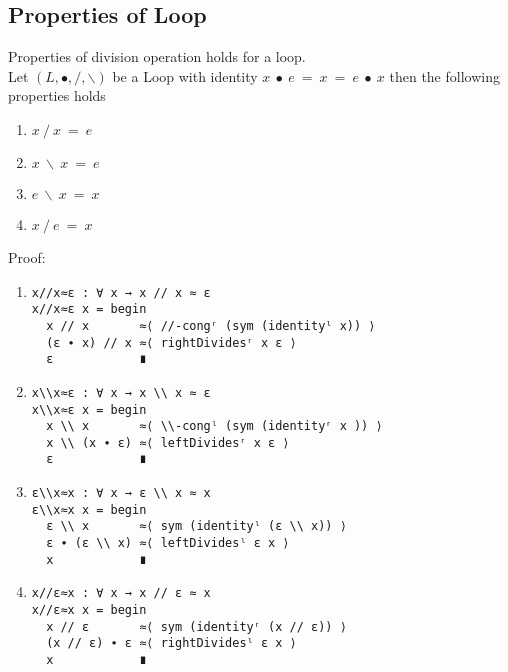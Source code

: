 \subsection{Properties of Loop}
Properties of division operation holds for a loop.\\
Let $(L, ∙, /, \backslash)$ be a Loop with identity $x\ ∙\ e\ =\ x\ =\ e\ ∙\ x$
then the following properties holds 
\begin{enumerate}
\item \(x \ /\  x\ =\ e\) 
\item \( x\ \backslash \ x\ =\ e\)
\item \(e\ \backslash \ x\ =\ x\) 
\item \(x\ /\ e\ =\ x\) 
\end{enumerate}
Proof:
\begin{enumerate}
\item 
\begin{verbatim}
x//x≈ε : ∀ x → x // x ≈ ε
x//x≈ε x = begin
  x // x       ≈⟨ //-congʳ (sym (identityˡ x)) ⟩
  (ε ∙ x) // x ≈⟨ rightDividesʳ x ε ⟩
  ε            ∎
\end{verbatim}
\item
\begin{verbatim}
x\\x≈ε : ∀ x → x \\ x ≈ ε
x\\x≈ε x = begin
  x \\ x       ≈⟨ \\-congˡ (sym (identityʳ x )) ⟩
  x \\ (x ∙ ε) ≈⟨ leftDividesʳ x ε ⟩
  ε            ∎
\end{verbatim}
\item
\begin{verbatim}
ε\\x≈x : ∀ x → ε \\ x ≈ x
ε\\x≈x x = begin
  ε \\ x       ≈⟨ sym (identityˡ (ε \\ x)) ⟩
  ε ∙ (ε \\ x) ≈⟨ leftDividesˡ ε x ⟩
  x            ∎
\end{verbatim}
\item
\begin{verbatim}
x//ε≈x : ∀ x → x // ε ≈ x
x//ε≈x x = begin
  x // ε       ≈⟨ sym (identityʳ (x // ε)) ⟩
  (x // ε) ∙ ε ≈⟨ rightDividesˡ ε x ⟩
  x            ∎
\end{verbatim}
\end{enumerate}
